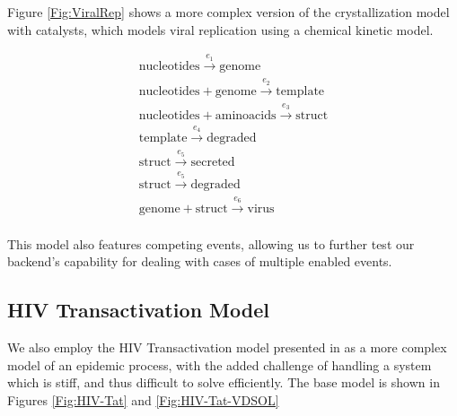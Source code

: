 \documentclass[11pt]{article}
\begin{document}
Figure \ref{Fig:ViralRep} shows a more complex version of the crystallization model with catalysts, which models viral replication using a chemical kinetic model.

\begin{eqnarray}
\mathrm{nucleotides} \overset{e_1}{\rightarrow} \mathrm{genome}\\
\mathrm{nucleotides} + \mathrm{genome} \overset{e_2}{\rightarrow} \mathrm{template}\\
\mathrm{nucleotides} + \mathrm{aminoacids} \overset{e_3}{\rightarrow} \mathrm{struct}\\
\mathrm{template} \overset{e_4}{\rightarrow} \mathrm{degraded}\\
\mathrm{struct} \overset{e_5}{\rightarrow} \mathrm{secreted}\\
\mathrm{struct} \overset{e_5}{\rightarrow} \mathrm{degraded}\\
\mathrm{genome} + \mathrm{struct} \overset{e_6}{\rightarrow} \mathrm{virus}\\
\end{eqnarray}

This model also features competing events, allowing us to further test our backend's capability for dealing with cases of multiple enabled events.

\subsection{HIV Transactivation Model}

We also employ the HIV Transactivation model presented in \cite{weinberger2005stochastic} as a more complex model of an epidemic process, with the added challenge of handling a system which is stiff, and thus difficult to solve efficiently.  The base model is shown in Figures \ref{Fig:HIV-Tat} and \ref{Fig:HIV-Tat-VDSOL}
\end{document}
